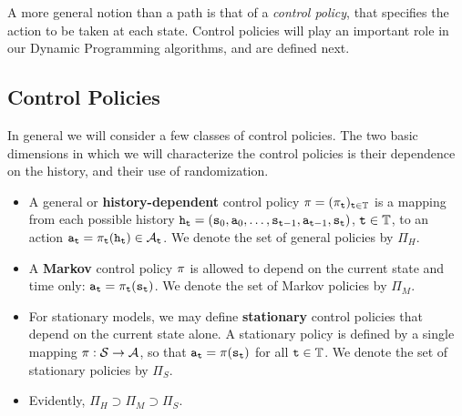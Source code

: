 A more general notion than a path is that of a \emph{control
policy}, that specifies the action to be taken at each state.
Control policies will play an important role in our Dynamic
Programming algorithms, and are defined next.

\subsection{Control Policies}

In general we will consider a few classes of control policies. The
two basic dimensions in which we will characterize the control
policies is their dependence on the history, and their use of
randomization.


\begin{itemize}
\item
A general or \textbf{history-dependent} control policy $\pi  =
{({\pi _{\tt t}})_{{\tt t} \in \mathbb{T}}}$ is a mapping from each
possible history ${{\tt h}_{\tt t}} = ({{\tt s}_0},{{\tt a}_0},
\ldots ,{{\tt s}_{{\tt t}-1}},{{\tt a}_{{\tt t}-1}},{{\tt s}_{\tt t}})$,
${\tt t} \in \mathbb{T}$, to an action ${{\tt a}_{\tt t}} = {\pi
_{\tt t}}({{\tt h}_{\tt t}}) \in {\mathcal{A}_{\tt t}}$.  We denote the
set of general policies by ${\Pi _H}$.
%
\item
A \textbf{Markov} control policy $\pi $ is allowed to depend on
the current state and time only: ${{\tt a}_{\tt t}} = {\pi
_{\tt t}}({{\tt s}_{\tt t}})$.   We denote the set of Markov policies
by ${\Pi _M}$.
%
\item
For stationary models, we may define \textbf{stationary} control
policies that depend on the current state alone. A stationary policy
is defined by a single mapping $\pi :\mathcal{S} \to \mathcal{A}$, so
that ${{\tt a}_{\tt t}} = \pi ({{\tt s}_{\tt t}})$ for all ${\tt t}
\in \mathbb{T}$. We denote the set of stationary policies by ${\Pi _S}$.
%
\item
Evidently, ${\Pi _H} \supset {\Pi _M} \supset {\Pi _S}$.
\end{itemize}

